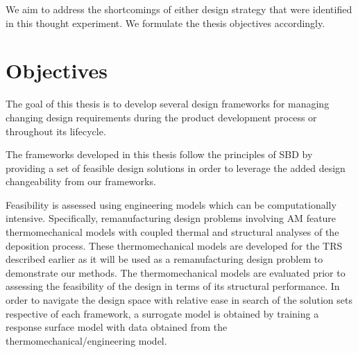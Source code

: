 We aim to address the shortcomings of either design strategy that were identified in this thought experiment. We formulate the thesis objectives accordingly.

\section{Objectives} \label{sec:objectives}




The goal of this thesis is to develop several design frameworks for managing changing design requirements during the product development process or throughout its lifecycle. 

The frameworks developed in this thesis follow the principles of \acf{SBD} by providing a set of feasible design solutions in order to leverage the added design changeability from our frameworks. 

Feasibility is assessed using engineering models which can be computationally intensive. Specifically, remanufacturing design problems involving \ac{AM} feature thermomechanical models with coupled thermal and structural analyses of the deposition process. These thermomechanical models are developed for the \ac{TRS} described earlier as it will be used as a remanufacturing design problem to demonstrate our methods. The thermomechanical models are evaluated prior to assessing the feasibility of the design in terms of its structural performance. In order to navigate the design space with relative ease in search of the solution sets respective of each framework, a surrogate model is obtained by training a response surface model with data obtained from the thermomechanical/engineering model.


